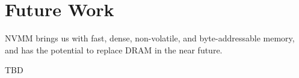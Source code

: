 \section{Future Work} 
\label{sec:future}

NVMM brings us with fast, dense,
non-volatile, and byte-addressable memory, and has the
potential to replace DRAM in the near future.

TBD


